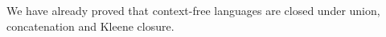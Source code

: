 

\setcounter{section}{7}
\setcounter{subsection}{3}
\setcounter{dfn}{6}

We have already proved that context-free languages are closed under union, concatenation and Kleene closure.



